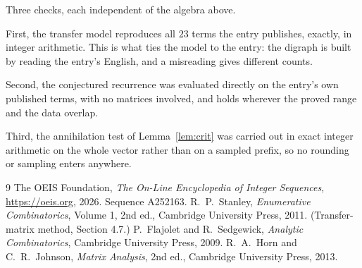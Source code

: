 \documentclass[11pt,a4paper]{article}
\theoremstyle{plain}
\theoremstyle{definition}
\begin{document}
Three checks, each independent of the algebra above.

First, the transfer model reproduces all $23$ terms the entry publishes, exactly, in
integer arithmetic. This is what ties the model to the entry: the digraph is built by reading
the entry's English, and a misreading gives different counts.

Second, the conjectured recurrence was evaluated directly on the entry's own published terms,
with no matrices involved, and holds wherever the proved range and the data overlap.

Third, the annihilation test of Lemma~\ref{lem:crit} was carried out in exact integer
arithmetic on the whole vector rather than on a sampled prefix, so no rounding or sampling
enters anywhere.

\begin{thebibliography}{9}
 The OEIS Foundation, \emph{The On-Line Encyclopedia of Integer
Sequences}, \url{https://oeis.org}, 2026. Sequence A252163.
 R.~P.~Stanley, \emph{Enumerative Combinatorics}, Volume 1, 2nd ed.,
Cambridge University Press, 2011. (Transfer-matrix method, Section 4.7.)
 P.~Flajolet and R.~Sedgewick, \emph{Analytic Combinatorics}, Cambridge
University Press, 2009.
 R.~A.~Horn and C.~R.~Johnson, \emph{Matrix Analysis}, 2nd ed., Cambridge
University Press, 2013.
\end{thebibliography}
\end{document}
